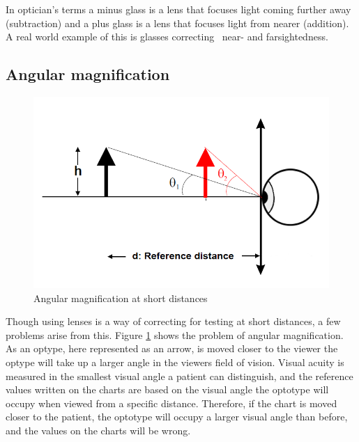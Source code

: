 \documentclass[12pt,a4paper,notitlepage]{report}
\begin{document}
In optician's terms a minus glass is a lens that focuses light coming further away (subtraction) and a plus glass is a lens that focuses light from nearer (addition). A real world example of this is glasses correcting ~near- and farsightedness. \cite{Acuity_Book}

\subsection{Angular magnification}
\begin{figure}[h]
\centering
\includegraphics[width=120mm]{images/Angular_magnification2.png}
\caption{Angular magnification at short distances\label{angular}}
\end{figure}

Though using lenses is a way of correcting for testing at short distances, a few problems arise from this. Figure \ref{angular} shows the problem of angular magnification. As an optype, here represented as an arrow, is moved closer to the viewer the optype will take up a larger angle in the viewers field of vision. Visual acuity is measured in the smallest visual angle a patient can distinguish, and the reference values written on the charts are based on the visual angle the optotype will occupy when viewed from a specific distance. Therefore, if the chart is moved closer to the patient, the optotype will occupy a larger visual angle than before, and the values on the charts will be wrong.
\end{document}
